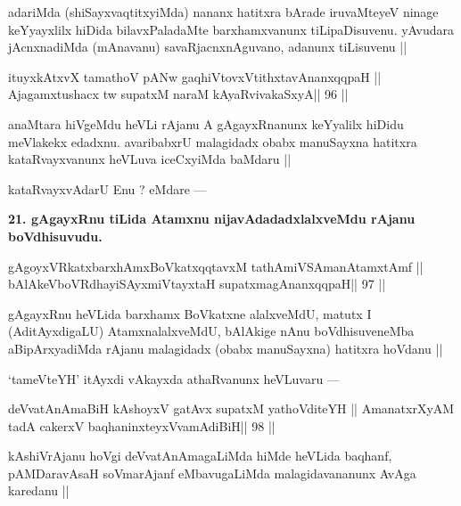 \begin{artha}
adariMda (shiSayxvaqtitxyiMda) nananx hatitxra bArade iruvaMteyeV 
ninage keYyayxlilx hiDida bilavxPaladaMte barxhamxvanunx 
tiLipaDisuvenu. yAvudara jAcnxnadiMda (mAnavanu) savaRjacnxnAguvano, adanunx tiLisuvenu ||
\end{artha}

\begin{shl}
ituyxkAtxvX tamathoV pANw gaqhiVtovxVtithxtavAnanxqqpaH ||
Ajagamxtushacx tw supatxM naraM kAyaRvivakaSxyA\hfill || 96 ||
\end{shl}

\begin{artha}
anaMtara hiVgeMdu heVLi rAjanu A gAgayxRnanunx keYyalilx hiDidu meVlakekx edadxnu. avaribabxrU malagidadx obabx manuSayxna hatitxra kataRvayxvanunx heVLuva iceCxyiMda baMdaru ||
\end{artha} 
 
\begin{artha}
kataRvayxvAdarU Enu ? eMdare ---
\end{artha} 

\begin{artha}
{\bf 21. gAgayxRnu tiLida Atamxnu nijavAdadadxlalxveMdu rAjanu boVdhisuvudu.}
\end{artha}

\begin{shl}
gAgoyxVRkatxbarxhAmxBoVkatxqqtavxM tathA\s miVSAmanAtamxtAmf ||
bAlAkeVboVRdhayiSAyxmiVtayxtaH supatxmagAnanxqqpaH\hfill || 97 ||
\end{shl}

\begin{artha}
gAgayxRnu heVLida barxhamx BoVkatxne alalxveMdU, matutx I (AditAyxdigaLU) AtamxnalalxveMdU, bAlAkige nAnu boVdhisuveneMba aBipArxyadiMda rAjanu malagidadx (obabx manuSayxna) hatitxra hoVdanu ||
\end{artha}
 
\begin{artha}
`tameVteYH' itAyxdi vAkayxda athaRvanunx heVLuvaru ---
\end{artha}

\begin{shl}
deVvatAnAmaBiH kAshoyxV gatAvx supatxM yathoVditeYH ||
AmanatxrXyAM tadA cakerxV baqhaninxteyxVvamAdiBiH\hfill || 98 ||
\end{shl}

\begin{artha}
kAshiVrAjanu hoVgi deVvatAnAmagaLiMda hiMde heVLida baqhanf, 
pAMDaravAsaH soVmarAjanf eMbavugaLiMda malagidavananunx AvAga karedanu ||
\end{artha}

